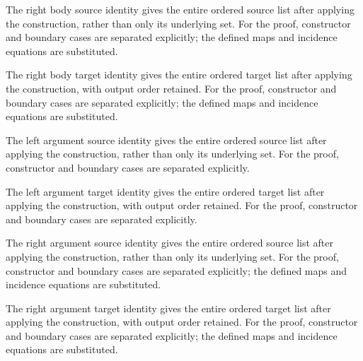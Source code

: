 The right body source identity gives the entire ordered source list after applying the construction, rather than only its underlying set.
For the proof, constructor and boundary cases are separated explicitly; the defined maps and incidence equations are substituted.
\par{}

The right body target identity gives the entire ordered target list after applying the construction, with output order retained.
For the proof, constructor and boundary cases are separated explicitly; the defined maps and incidence equations are substituted.
\par{}

The left argument source identity gives the entire ordered source list after applying the construction, rather than only its underlying set.
For the proof, constructor and boundary cases are separated explicitly.
\par{}

The left argument target identity gives the entire ordered target list after applying the construction, with output order retained.
For the proof, constructor and boundary cases are separated explicitly.
\par{}

The right argument source identity gives the entire ordered source list after applying the construction, rather than only its underlying set.
For the proof, constructor and boundary cases are separated explicitly; the defined maps and incidence equations are substituted.
\par{}

The right argument target identity gives the entire ordered target list after applying the construction, with output order retained.
For the proof, constructor and boundary cases are separated explicitly; the defined maps and incidence equations are substituted.
\par{}

